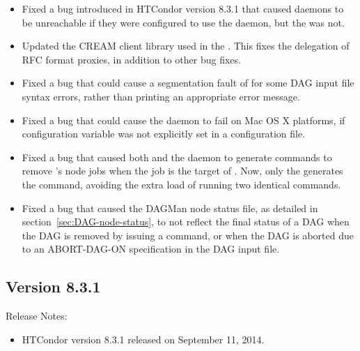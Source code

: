 \begin{itemize}

\item Fixed a bug introduced in HTCondor version 8.3.1 that caused daemons to be
unreachable if they were configured to use the  daemon,
but the  was not.

\item Updated the CREAM client library used in the .
This fixes the delegation of RFC format proxies, in addition to other
bug fixes.

\item Fixed a bug that could cause a segmentation fault of 
for some DAG input file syntax errors,
rather than printing an appropriate error message.

\item Fixed a bug that could cause the  daemon
to fail on Mac OS X platforms,
if configuration variable  was not explicitly set 
in a configuration file.

\item Fixed a bug that caused both  and the 
daemon to generate commands to remove 's node jobs when
the  job is the target of .
Now, only the  generates the command, 
avoiding the extra load of running two identical commands.

\item Fixed a bug that caused the DAGMan node status file,
as detailed in section~\ref{sec:DAG-node-status},
to not reflect the final status of a DAG when the DAG is removed
by issuing a  command,
or when the DAG is
aborted due to an ABORT-DAG-ON specification in the DAG input file.

\end{itemize}

\subsection*{\label{sec:New-8-3-1}Version 8.3.1}

\noindent Release Notes:

\begin{itemize}

\item HTCondor version 8.3.1 released on September 11, 2014.

\end{itemize}



